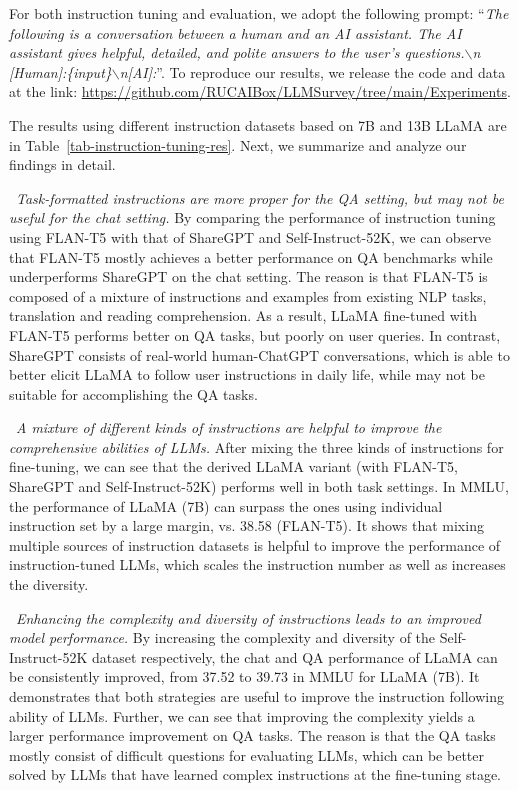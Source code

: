For both instruction tuning and evaluation, we adopt the following prompt: ``\emph{The following is a conversation between a human and an AI assistant. The AI assistant gives helpful, detailed, and polite answers to the user's questions.$\backslash$n [\textbar Human\textbar]:\{input\}$\backslash$n[\textbar AI\textbar]:}''.
To reproduce our results, we release the  code and data at the link:  \url{https://github.com/RUCAIBox/LLMSurvey/tree/main/Experiments}.

The results using different instruction datasets based on 7B and 13B LLaMA are in Table~\ref{tab-instruction-tuning-res}. Next, we summarize and analyze our findings in detail.

\textbullet~\emph{{Task-formatted instructions are more proper for the QA setting, but may not be useful for the chat setting.}}
By comparing the performance of instruction tuning using FLAN-T5 with that of ShareGPT and Self-Instruct-52K, we can observe that FLAN-T5 mostly achieves a better performance on QA benchmarks while underperforms ShareGPT on the chat setting.   %
The reason is that FLAN-T5 is composed of a mixture of instructions and examples from existing NLP tasks, \eg translation and reading comprehension. 
As a result, LLaMA  fine-tuned with FLAN-T5 performs better on QA tasks, but poorly on user queries.
In contrast, ShareGPT consists of real-world human-ChatGPT conversations, which is able to better elicit LLaMA to {follow user instructions} in daily life, while may not be suitable for accomplishing the QA tasks.

\textbullet~\emph{A mixture of different kinds of instructions are helpful to improve the comprehensive abilities of LLMs.}
After mixing the three kinds of instructions for fine-tuning, we can see that the derived LLaMA variant (with FLAN-T5, ShareGPT and Self-Instruct-52K) performs well in both task settings.   
In MMLU, the performance of LLaMA (7B) can surpass the ones using individual instruction set by a large margin,  vs. 38.58 (FLAN-T5).
It shows that mixing multiple sources of instruction datasets is  helpful to improve the performance of instruction-tuned LLMs, which  scales the instruction number as well as increases the  diversity. 


\textbullet~\emph{Enhancing the complexity and diversity of instructions leads to an improved model  performance.}
By increasing the  complexity and diversity of  the Self-Instruct-52K dataset respectively, the chat and QA performance of LLaMA can be consistently improved, {\eg from 37.52 to 39.73 in MMLU for LLaMA (7B)}.
It demonstrates that both strategies are useful to improve the instruction following ability of LLMs.
Further, we can see that improving the complexity yields a larger performance improvement  on QA tasks.
The reason is that the QA tasks mostly consist of difficult questions for evaluating LLMs, which can be better solved by LLMs that have learned complex instructions at the fine-tuning stage.


